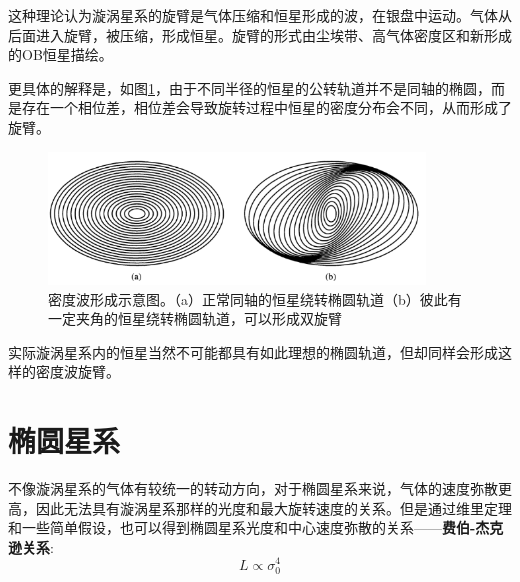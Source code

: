 这种理论认为漩涡星系的旋臂是气体压缩和恒星形成的波，在银盘中运动。气体从后面进入旋臂，被压缩，形成恒星。旋臂的形式由尘埃带、高气体密度区和新形成的OB恒星描绘。

更具体的解释是，如图\ref{fig:densitywave}，由于不同半径的恒星的公转轨道并不是同轴的椭圆，而是存在一个相位差，相位差会导致旋转过程中恒星的密度分布会不同，从而形成了旋臂。

\begin{figure}[hbt]
  \centering
  \includegraphics[width=10cm]{chapters/25/densitywave}
  \caption{密度波形成示意图。（a）正常同轴的恒星绕转椭圆轨道（b）彼此有一定夹角的恒星绕转椭圆轨道，可以形成双旋臂}
  \label{fig:densitywave}
\end{figure}

实际漩涡星系内的恒星当然不可能都具有如此理想的椭圆轨道，但却同样会形成这样的密度波旋臂。

\section{椭圆星系}
不像漩涡星系的气体有较统一的转动方向，对于椭圆星系来说，气体的速度弥散更高，因此无法具有漩涡星系那样的光度和最大旋转速度的关系。但是通过维里定理和一些简单假设，也可以得到椭圆星系光度和中心速度弥散的关系——\textbf{费伯-杰克逊关系}:
\begin{equation}
  L\propto\sigma_0^4
\end{equation}
